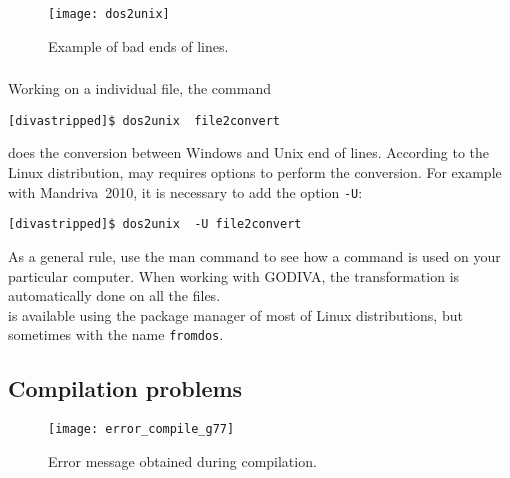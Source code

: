 \begin{figure}[htpb]
\centering
\texttt{[image: dos2unix]}
\caption{Example of bad ends of lines.\label{fig:error_dos2unix2}}
\end{figure}


\subsubsection{\answer}

Working on a individual file, the command\\

\begin{lstlisting}[style=Bash]
[divastripped]$ dos2unix  file2convert
\end{lstlisting}
does the conversion between Windows and Unix end of lines. According to the Linux distribution,  may requires options to perform the conversion. For example with Mandriva~2010, it is necessary to add the option \texttt{-U}:

\begin{lstlisting}[style=Bash]
[divastripped]$ dos2unix  -U file2convert
\end{lstlisting}
As a general rule, use the man command to see how a command is used on your particular computer. 
When working with GODIVA, the transformation is automatically done on all the files. \\
 is available using the package manager of most of Linux distributions, but sometimes with the name \texttt{fromdos}.


\subsection{Compilation problems\label{sec:error_compile}}

\begin{figure}[htpb]
\centering
\texttt{[image: error\_compile\_g77]}
\caption{Error message obtained during compilation. \label{fig:error_compile}}
\end{figure}

\subsection{\question}

